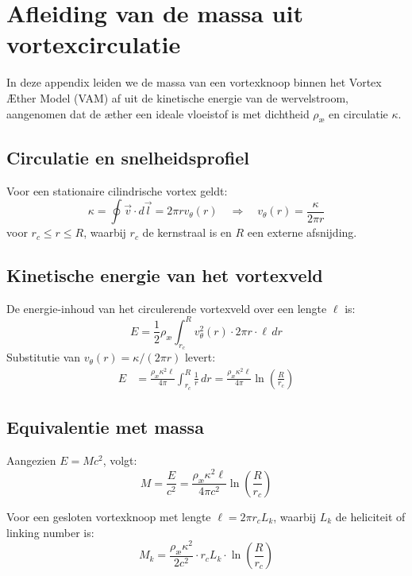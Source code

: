 \section{Afleiding van de massa uit vortexcirculatie}

In deze appendix leiden we de massa van een vortexknoop binnen het Vortex Æther Model (VAM) af uit de kinetische energie van de wervelstroom, aangenomen dat de æther een ideale vloeistof is met dichtheid \( \rho_\text{\ae} \) en circulatie \( \kappa \).

\subsection{Circulatie en snelheidsprofiel}
Voor een stationaire cilindrische vortex geldt:
\begin{equation}
    \kappa = \oint \vec{v} \cdot d\vec{l} = 2\pi r v_\theta(r) \quad \Rightarrow \quad v_\theta(r) = \frac{\kappa}{2\pi r}
\end{equation}
voor \( r_c \leq r \leq R \), waarbij \( r_c \) de kernstraal is en \( R \) een externe afsnijding.

\subsection{Kinetische energie van het vortexveld}
De energie-inhoud van het circulerende vortexveld over een lengte \( \ell \) is:
\begin{equation}
    E = \frac{1}{2} \rho_\text{\ae} \int_{r_c}^{R} v_\theta^2(r) \cdot 2\pi r \cdot \ell \, dr
\end{equation}
Substitutie van \( v_\theta(r) = \kappa / (2\pi r) \) levert:
\begin{align}
    E &= \frac{\rho_\text{\ae} \kappa^2 \ell}{4\pi} \int_{r_c}^{R} \frac{1}{r} \, dr = \frac{\rho_\text{\ae} \kappa^2 \ell}{4\pi} \ln\left( \frac{R}{r_c} \right)
\end{align}

\subsection{Equivalentie met massa}
Aangezien \( E = M c^2 \), volgt:
\begin{equation}
    M = \frac{E}{c^2} = \frac{\rho_\text{\ae} \kappa^2 \ell}{4\pi c^2} \ln\left( \frac{R}{r_c} \right)
\end{equation}

Voor een gesloten vortexknoop met lengte \( \ell = 2\pi r_c L_k \), waarbij \( L_k \) de heliciteit of linking number is:
\begin{equation}
    M_k = \frac{\rho_\text{\ae} \kappa^2}{2 c^2} \cdot r_c L_k \cdot \ln\left( \frac{R}{r_c} \right)
\end{equation}

